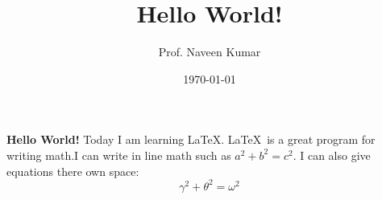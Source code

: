\documentclass[10pt,a4 paper]{article}
\title{\Large\textbf{Hello World!}}
\author{Prof. Naveen Kumar}
\date{\today}
\begin{document}
\maketitle
\textbf{Hello World!} Today I am learning \LaTeX. \LaTeX\ is a great program for writing math.I can write in line math such as $a^2+b^2=c^2$. I can also give equations there own space:
$$\gamma^2 + \theta^2 = \omega^2$$
\end{document}
